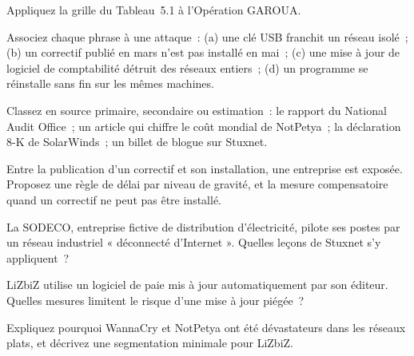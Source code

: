 \bigskip

\begin{boxexo}[title={\ding{45}\quad Exercice~5.1. La grille \niveaubase}]
Appliquez la grille du Tableau~5.1 à l'Opération GAROUA.
\end{boxexo}

\begin{boxexo}[title={\ding{45}\quad Exercice~5.2. Quelle attaque~? \niveaubase}]
Associez chaque phrase à une attaque~: (a) une clé USB franchit un réseau
isolé~; (b) un correctif publié en mars n'est pas installé en mai~; (c)
une mise à jour de logiciel de comptabilité détruit des réseaux entiers~;
(d) un programme se réinstalle sans fin sur les mêmes machines.
\end{boxexo}

\begin{boxexo}[title={\ding{45}\quad Exercice~5.3. Les sources \niveaubase}]
Classez en source primaire, secondaire ou estimation~: le rapport du
National Audit Office~; un article qui chiffre le coût mondial de
NotPetya~; la déclaration 8-K de SolarWinds~; un billet de blogue sur
Stuxnet.
\end{boxexo}

\begin{boxexo}[title={\ding{45}\quad Exercice~5.4. Le correctif \niveaumoyen}]
Entre la publication d'un correctif et son installation, une entreprise
est exposée. Proposez une règle de délai par niveau de gravité, et la
mesure compensatoire quand un correctif ne peut pas être installé.
\end{boxexo}

\begin{boxexo}[title={\ding{45}\quad Exercice~5.5. L'isolement \niveaumoyen}]
La SODECO, entreprise fictive de distribution d'électricité, pilote ses
postes par un réseau industriel « déconnecté d'Internet ». Quelles leçons
de Stuxnet s'y appliquent~?
\end{boxexo}

\begin{boxexo}[title={\ding{45}\quad Exercice~5.6. Le fournisseur \niveaumoyen}]
LiZbiZ utilise un logiciel de paie mis à jour automatiquement par son
éditeur. Quelles mesures limitent le risque d'une mise à jour piégée~?
\end{boxexo}

\begin{boxexo}[title={\ding{45}\quad Exercice~5.7. Réseau plat \niveaumoyen}]
Expliquez pourquoi WannaCry et NotPetya ont été dévastateurs dans les
réseaux plats, et décrivez une segmentation minimale pour LiZbiZ.
\end{boxexo}

